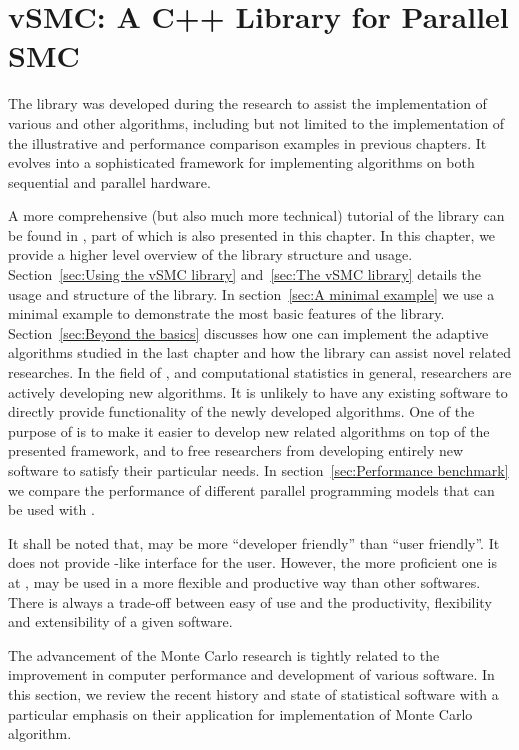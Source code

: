 \chapter{vSMC: A C++ Library for Parallel SMC}
\label{cha:vSMC: A C++ Library for Parallel SMC}

The \vsmc library \cite{software:VSMC} was developed during the research to
assist the implementation of various \smc and other algorithms, including but
not limited to the implementation of the illustrative and performance
comparison examples in previous chapters. It evolves into a sophisticated \cpp
framework for implementing \smc algorithms on both sequential and parallel
hardware.

A more comprehensive (but also much more technical) tutorial of the library
can be found in \cite{software:VSMC}, part of which is also presented in this
chapter. In this chapter, we provide a higher level overview of the library
structure and usage. Section~\ref{sec:Using the vSMC library} and~\ref{sec:The
  vSMC library} details the usage and structure of the library. In
section~\ref{sec:A minimal example} we use a minimal example to demonstrate
the most basic features of the library. Section~\ref{sec:Beyond the basics}
discusses how one can implement the adaptive algorithms studied in the last
chapter and how the library can assist novel \smc related researches. In the
field of \smc, and computational statistics in general, researchers are
actively developing new algorithms. It is unlikely to have any existing
software to directly provide functionality of the newly developed algorithms.
One of the purpose of \vsmc is to make it easier to develop new \smc related
algorithms on top of the presented framework, and to free researchers from
developing entirely new software to satisfy their particular needs. In
section~\ref{sec:Performance benchmark} we compare the performance of
different parallel programming models that can be used with \vsmc.

It shall be noted that, \vsmc may be more ``developer friendly'' than ``user
friendly''. It does not provide \bugs-like interface for the user. However,
the more proficient one is at \cpp, \vsmc may be used in a more flexible and
productive way than other softwares. There is always a trade-off between easy
of use and the productivity, flexibility and extensibility of a given
software.

The advancement of the Monte Carlo research is tightly related to the
improvement in computer performance and development of various software. In
this section, we review the recent history and state of statistical software
with a particular emphasis on their application for implementation of Monte
Carlo algorithm.

